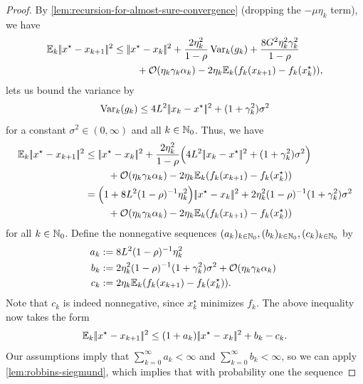 \begin{proof}
    By \cref{lem:recursion-for-almost-sure-convergence} (dropping the $-\mu\eta_k$ term), we have
    \begin{align*}
        \mathbb{E}_k|\!|x^\star - x_{k+1}|\!|^2
        &\leq
        |\!|x^\star - x_k|\!|^2
        + \frac{2\eta_k^2}{1 - \rho}\operatorname{Var}_k(g_k) + \frac{8 G^2\eta_k^2\gamma_k^2}{1 - \rho} \\
        &\phantom{===} + \mathcal{O}(\eta_k\gamma_k\alpha_k)
        - 2\eta_k\mathbb{E}_k(f_{k}(x_{k+1}) - f_{k}(x_k^\star)),
    \end{align*}
     lets us bound
    the variance by
    \[
        \operatorname{Var}_k(g_k) \leq 4 L^2 |\!|x_k - x^\star|\!|^2 + (1 + \gamma_k^2)\sigma^2
    \]
    for a constant $\sigma^2\in(0,\infty)$ and all $k\in\mathbb{N}_0$.
    Thus, we have
    \begin{align*}
        \E_k\norm{x^\star - x_{k+1}}^2
        &\leq
        \norm{x^\star - x_k}^2
        + \frac{2\eta_k^2}{1-\rho}\Big( 4 L^2 \norm{x_k - x^\star}^2 + (1 + \gamma_k^2)\sigma^2 \Big) \\
        &\phantom{===} + \mathcal{O}(\eta_k\gamma_k\alpha_k) - 2\eta_k\E_k(f_{k}(x_{k+1}) - f_{k}(x_k^\star))\\
        &=
        \Big( 1 + 8 L^2(1-\rho)^{-1} \eta_k^2 \Big)\norm{x^\star - x_k}^2
        + 2\eta_k^2(1-\rho)^{-1} (1 + \gamma_k^2) \sigma^2 \\
        &\phantom{===} + \mathcal{O}(\eta_k\gamma_k\alpha_k) - 2\eta_k\E_k(f_{k}(x_{k+1}) - f_{k}(x_k^\star))
    \end{align*}
    for all $k\in\mathbb{N}_0$.
    Define the nonnegative sequences $(a_k)_{k\in\mathbb{N}_0}, (b_k)_{k\in\mathbb{N}_0}, (c_k)_{k\in\mathbb{N}_0}$ by
    \begin{align*}
        a_k &:= 8L^2(1-\rho)^{-1}\eta_k^2 \\
        b_k &:= 2\eta_k^2(1-\rho)^{-1}(1 + \gamma_k^2) \sigma^2 + \mathcal{O}(\eta_k\gamma_k\alpha_k)\ \\
        c_k &:= 2\eta_k\mathbb{E}_k(f_{k}(x_{k+1}) - f_{k}(x_k^\star)).
    \end{align*}
    Note that $c_k$ is indeed nonnegative, since $x_k^\star$ minimizes $f_k$.
    The above inequality now takes the form
    \[
        \mathbb{E}_k|\!|x^\star - x_{k+1}|\!|^2
        \leq
        (1 + a_k)|\!|x^\star - x_k|\!|^2
        + b_k - c_k.
    \]
    Our assumptions imply that $\sum_{k=0}^{\infty} a_k < \infty$ and $\sum_{k=0}^\infty b_k < \infty$,
    so we can apply
    \cref{lem:robbins-siegmund}, which implies that with probability one the sequence

\end{proof}
